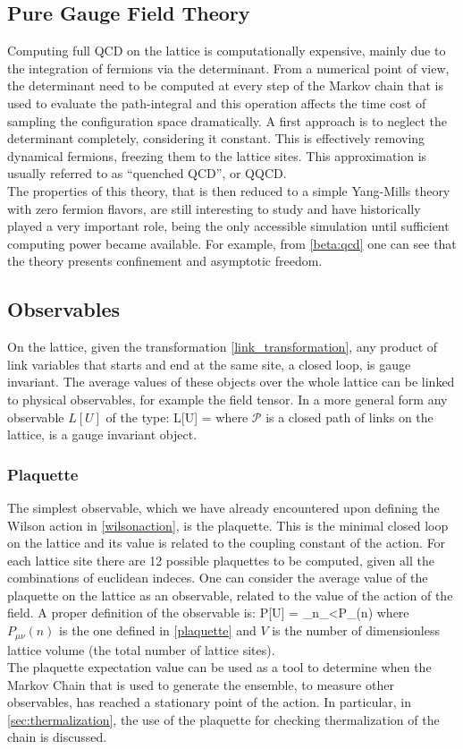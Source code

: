 \subsection{Pure Gauge Field Theory}
Computing full QCD on the lattice is computationally expensive, mainly due to the integration of fermions via the determinant. From a numerical point of view, the determinant need to be computed at every step of the Markov chain that is used to evaluate the path-integral and this operation affects the time cost of sampling the configuration space dramatically. A first approach is to neglect the determinant completely, considering it constant. This is effectively removing dynamical fermions, freezing them to the lattice sites. This approximation is usually referred to as ``quenched QCD'', or QQCD. \\
The properties of this theory, that is then reduced to a simple Yang-Mills theory with zero fermion flavors, are still interesting to study and have historically played a very important role, being the only accessible simulation until sufficient computing power became available. For example, from \cref{beta:qcd} one can see that the theory presents confinement and asymptotic freedom. 

\subsection{Observables}
On the lattice, given the transformation \cref{link_transformation}, any product of link variables that starts and end at the same site, a closed loop, is gauge invariant. The average values of these objects over the whole lattice can be linked to physical observables, for example the field tensor. In a more general form any observable $L[U]$ of the type:
\beq
    L[U] = \Tr {}
\eeq
where $\mathcal{P}$ is a closed path of links on the lattice, is a gauge invariant object.

\subsubsection{Plaquette}
The simplest observable, which we have already encountered upon defining the Wilson action in \cref{wilsonaction}, is the plaquette. This is the minimal closed loop on the lattice and its value is related to the coupling constant of the action. For each lattice site there are 12 possible plaquettes to be computed, given all the combinations of euclidean indeces. One can consider the average value of the plaquette on the lattice as an observable, related to the value of the action of the field. A proper definition of the observable is:
\beq
    P[U] = \sum_{n\in\Lambda}\sum_{\mu<\nu}P_{\mu\nu}(n)
\eeq
where $P_{\mu\nu}(n)$ is the one defined in \cref{plaquette} and $V$ is the number of dimensionless lattice volume (the total number of lattice sites). \\
The plaquette expectation value can be used as a tool to determine when the Markov Chain that is used to generate the ensemble, to measure  other observables, has reached a stationary point of the action. In particular, in \cref{sec:thermalization}, the use of the plaquette for checking thermalization of the chain is discussed.

